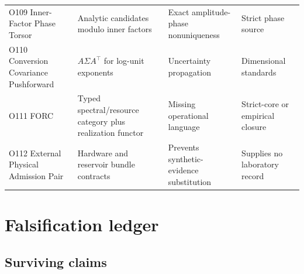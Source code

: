 \documentclass[11pt,a4paper,openany]{report}
\begin{document}
\begin{center}
\begin{longtable}{@{}p{}p{}p{}p{}@{}}
O109 Inner-Factor Phase Torsor & Analytic candidates modulo inner factors & Exact amplitude-phase nonuniqueness & Strict phase source \\
O110 Conversion Covariance Pushforward & \(A\Sigma A^\top\) for log-unit exponents & Uncertainty propagation & Dimensional standards \\
O111 FORC & Typed spectral/\allowbreak{}resource category plus realization functor & Missing operational language & Strict-core or empirical closure \\
O112 External Physical Admission Pair & Hardware and reservoir bundle contracts & Prevents synthetic-evidence substitution & Supplies no laboratory record \\
\bottomrule
\end{longtable}
\endgroup
\end{center}

\chapter{Falsification ledger}

\section{Surviving claims}
\end{document}
